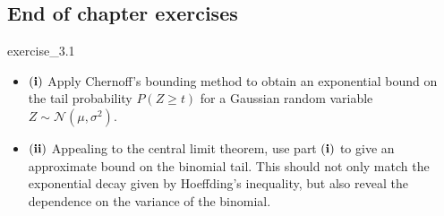 \subsection{End of chapter exercises}
\begin{exercise}{}{exercise_3.1}
    \begin{itemize}
        \item $\bf (i)$ Apply Chernoff's bounding method to obtain an exponential bound on the tail probability $P(Z\ge t)$ for a Gaussian random variable $Z\sim\mathcal{N}(\mu, \sigma^2)$.
        \item $\bf (ii)$ Appealing to the central limit theorem, use part $\bf (i)$ to give an approximate bound on the binomial tail. This should not only match the exponential decay given by Hoeffding’s inequality, but also reveal the dependence on the variance of the binomial.
    \end{itemize}
\end{exercise}

